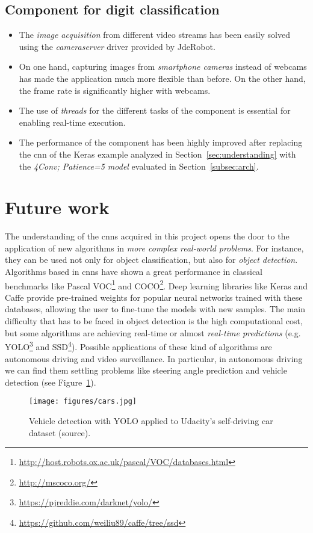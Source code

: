\subsection*{Component for digit classification}
\begin{itemize}
	\item The \emph{image acquisition} from different video streams has been easily solved using the \textit{cameraserver} driver provided by JdeRobot.
	\item On one hand, capturing images from \emph{smartphone cameras} instead of webcams has made the application much more flexible than before. On the other hand, the frame rate is significantly higher with webcams.
	\item The use of \emph{threads} for the different tasks of the component is essential for enabling real-time execution.
	\item The performance of the component has been highly improved after replacing the \gls{cnn} of the Keras example analyzed in Section~\ref{sec:understanding} with the \emph{\textit{4Conv; Patience=5} model} evaluated in Section~\ref{subsec:arch}.
\end{itemize}

\section{Future work}
The understanding of the \glspl{cnn} acquired in this project opens the door to the application of new algorithms in \emph{more complex real-world problems}. For instance, they can be used not only for object classification, but also for \emph{object detection}. Algorithms based in \glspl{cnn} have shown a great performance in classical benchmarks like Pascal VOC\footnote{\url{http://host.robots.ox.ac.uk/pascal/VOC/databases.html}} and COCO\footnote{\url{http://mscoco.org/}}. Deep learning libraries like Keras and Caffe provide pre-trained weights for popular neural networks trained with these databases, allowing the user to fine-tune the models with new samples. The main difficulty that has to be faced in object detection is the high computational cost, but some algorithms are achieving real-time or almost \emph{real-time predictions} (e.g. YOLO\footnote{\url{https://pjreddie.com/darknet/yolo/}} and SSD\footnote{\url{https://github.com/weiliu89/caffe/tree/ssd}}). Possible applications of these kind of algorithms are autonomous driving and video surveillance. In particular, in autonomous driving we can find them settling problems like steering angle prediction and vehicle detection (see Figure~\ref{fig:vehicle}).
\begin{figure}
	\centering
	\texttt{[image: figures/cars.jpg]}
	\caption{Vehicle detection with YOLO applied to Udacity's self-driving car dataset (source\cite{udacity}).}
	\label{fig:vehicle}
\end{figure}

